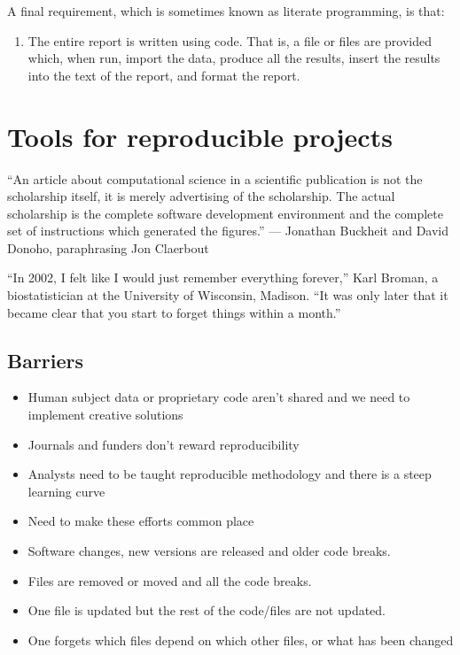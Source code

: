 \documentclass[
]{book}
\providecommand{\tightlist}{%
  \setlength{\itemsep}{0pt}\setlength{\parskip}{0pt}}
\begin{document}
A final requirement, which is sometimes known as literate programming, is that:

\begin{enumerate}
\def\labelenumi{\alph{enumi})}
\setcounter{enumi}{5}
\tightlist
\item
  The entire report is written using code. That is, a file or files are provided which, when run, import the data, produce all the results, insert the results into the text of the report, and format the report.
\end{enumerate}

\hypertarget{tools-for-reproducible-projects}{%
\chapter{Tools for reproducible projects}\label{tools-for-reproducible-projects}}

``An article about computational science in a scientific publication is not the scholarship itself,
it is merely advertising of the scholarship. The actual scholarship is the complete software development environment and the complete set of instructions which generated the figures.''
--- Jonathan Buckheit and David Donoho, paraphrasing Jon Claerbout

``In 2002, I felt like I would just remember everything forever,'' Karl Broman, a biostatistician at the University of Wisconsin, Madison. ``It was only later that it became clear that you start to forget things within a month.''

\hypertarget{barriers}{%
\section{Barriers}\label{barriers}}

\begin{itemize}
\tightlist
\item
  Human subject data or proprietary code aren't shared and we need to implement creative solutions
\item
  Journals and funders don't reward reproducibility
\item
  Analysts need to be taught reproducible methodology and there is a steep learning curve
\item
  Need to make these efforts common place
\item
  Software changes, new versions are released and older code breaks.
\item
  Files are removed or moved and all the code breaks.
\item
  One file is updated but the rest of the code/files are not updated.
\item
  One forgets which files depend on which other files, or what has been changed
\end{itemize}
\end{document}
